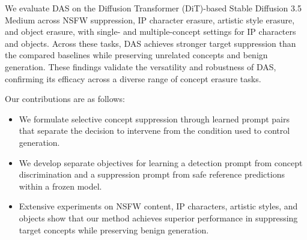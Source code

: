 We evaluate DAS on the Diffusion Transformer (DiT)-based Stable Diffusion 3.5 Medium across NSFW suppression, IP character erasure, artistic style erasure, and object erasure, with single- and multiple-concept settings for IP characters and objects.
Across these tasks, DAS achieves stronger target suppression than the compared baselines while preserving unrelated concepts and benign generation.
These findings validate the versatility and robustness of DAS, confirming its efficacy across a diverse range of concept erasure tasks.

Our contributions are as follows:
\begin{itemize}
    \item We formulate selective concept suppression through learned prompt pairs that separate the decision to intervene from the condition used to control generation.
    \item We develop separate objectives for learning a detection prompt from concept discrimination and a suppression prompt from safe reference predictions within a frozen model.
    \item Extensive experiments on NSFW content, IP characters, artistic styles, and objects show that our method achieves superior performance in suppressing target concepts while preserving benign generation.
\end{itemize}

